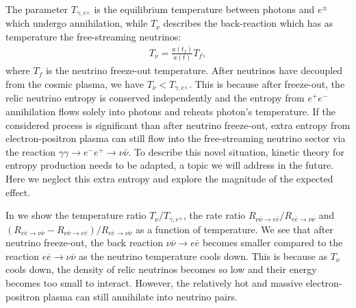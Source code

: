 The parameter $T_{\gamma,e^\pm}$ is the equilibrium temperature between photons and $e^\pm$ which undergo annihilation, while   $T_\nu$ describes the back-reaction which has as temperature the free-streaming neutrinos: 
\begin{align}
T_\nu=\frac{a(t_f)}{a(t)}T_f,
\end{align}
where $T_f$ is the neutrino freeze-out temperature. After neutrinos have decoupled from the cosmic plasma, we have $T_\nu < T_{\gamma,e^\pm}$. This is because after freeze-out, the relic neutrino entropy is conserved independently and the entropy from $e^+e^-$ annihilation flows solely into photons and reheats  photon's temperature. If  the considered process is significant than after neutrino freeze-out, extra entropy from electron-positron plasma can still flow into the free-streaming neutrino sector via the reaction $\gamma\gamma\to e^-e^+\to\nu\bar{\nu}$. To describe this novel situation, kinetic theory for entropy production needs to be adapted, a topic we will address in the future. Here we neglect this extra entropy and explore the magnitude of the expected effect.  

In   we show the temperature ratio $T_\nu/T_{\gamma,e^\pm}$, the rate ratio $R_{\nu\overline{\nu}\rightarrow e\overline{e}}/ R_{e\overline{e}\rightarrow\nu\overline{\nu}}$ and $(R_{e\overline{e}\rightarrow\nu\overline{\nu}}-R_{\nu\overline{\nu}\rightarrow e\overline{e}})/ R_{e\overline{e}\rightarrow\nu\overline{\nu}}$ as a function of temperature. We see that after neutrino freeze-out, the back reaction $\nu\overline{\nu}\rightarrow e\overline{e}$ becomes smaller compared to the reaction $e\overline{e}\rightarrow\nu\overline{\nu}$ as the neutrino temperature cools down. This is because as $T_\nu$ cools down, the density of relic neutrinos becomes so low and their energy becomes too small to interact. However, the relatively hot and massive electron-positron plasma can still annihilate into neutrino pairs.

